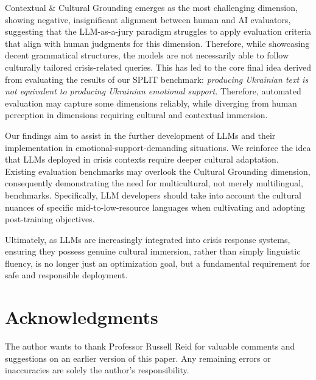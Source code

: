 \documentclass[10pt, twocolumn]{article}
\begin{document}
Contextual \& Cultural Grounding emerges as the most challenging dimension, showing negative, insignificant alignment between human and AI evaluators, suggesting that the LLM-as-a-jury paradigm struggles to apply evaluation criteria that align with human judgments for this dimension. Therefore, while showcasing decent grammatical structures, the models are not necessarily able to follow culturally tailored crisis-related queries. This has led to the core final idea derived from evaluating the results of our SPLIT benchmark: \textit{producing Ukrainian text is not equivalent to producing Ukrainian emotional support.} Therefore, automated evaluation may capture some dimensions reliably, while diverging from human perception in dimensions requiring cultural and contextual immersion.

Our findings aim to assist in the further development of LLMs and their implementation in emotional-support-demanding situations. We reinforce the idea that LLMs deployed in crisis contexts require deeper cultural adaptation. Existing evaluation benchmarks may overlook the Cultural Grounding dimension, consequently demonstrating the need for multicultural, not merely multilingual, benchmarks. Specifically, LLM developers should take into account the cultural nuances of specific mid-to-low-resource languages when cultivating and adopting post-training objectives.

Ultimately, as LLMs are increasingly integrated into crisis response systems, ensuring they possess genuine cultural immersion, rather than simply linguistic fluency, is no longer just an optimization goal, but a fundamental requirement for safe and responsible deployment.

\section{Acknowledgments}
The author wants to thank Professor Russell Reid for valuable comments and suggestions on an earlier version of this paper. Any remaining errors or inaccuracies are solely the author's responsibility.

 
\end{document}
